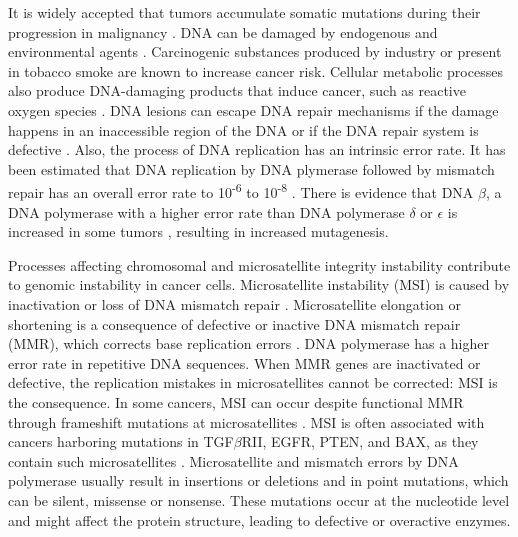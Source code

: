     It is widely accepted that tumors accumulate somatic mutations during their
    progression in malignancy {\cite{accumulation_rates}}
    {\cite{mutations_counting}}. DNA can be damaged by endogenous and
    environmental agents {\cite{multiple_mutations}}. Carcinogenic substances
    produced by industry {\cite{occupational_exposure}} {\cite{rubber_industry}}
    or present in tobacco smoke {\cite{smoking_cancer}} are known to increase
    cancer risk. Cellular metabolic processes also produce DNA-damaging products
    that induce cancer, such as reactive oxygen species {\cite{ros_cancer}}
    {\cite{ros_cancer_other}}. DNA lesions can escape DNA repair mechanisms if
    the damage happens in an inaccessible region of the DNA or if the DNA repair
    system is defective {\cite{dna_repair}}. Also, the process of DNA
    replication has an intrinsic error rate. It has been estimated that DNA
    replication by DNA plymerase followed by mismatch repair has an overall
    error rate to 10\textsuperscript{-6} to 10\textsuperscript{-8}
    {\cite{multiple_mutations}}. There is evidence that DNA $\beta$, a DNA
    polymerase with a higher error rate than DNA polymerase $\delta$ or
    $\epsilon$ is increased in some tumors {\cite{dna_pol}}, resulting in
    increased mutagenesis.

    Processes affecting chromosomal and microsatellite integrity instability
    contribute to genomic instability in cancer cells. Microsatellite
    instability (MSI) is caused by inactivation or loss of DNA mismatch repair
    {\cite{msi}}. Microsatellite elongation or shortening is a consequence of
    defective or inactive DNA mismatch repair (MMR), which corrects base
    replication errors {\cite{cin_crc}}. DNA polymerase has a higher error rate
    in repetitive DNA sequences. When MMR genes are inactivated or defective,
    the replication mistakes in microsatellites cannot be corrected: MSI is the
    consequence. In some cancers, MSI can occur despite functional MMR through
    frameshift mutations at microsatellites {\cite{cin_crc}}. MSI is often
    associated with cancers harboring mutations in TGF$\beta$RII, EGFR, PTEN,
    and BAX, as they contain such microsatellites {\cite{micro}}. Microsatellite
    and mismatch errors by DNA polymerase usually result in insertions or
    deletions and in point mutations, which can be silent, missense or nonsense.
    These mutations occur at the nucleotide level and might affect the protein
    structure, leading to defective or overactive enzymes.

